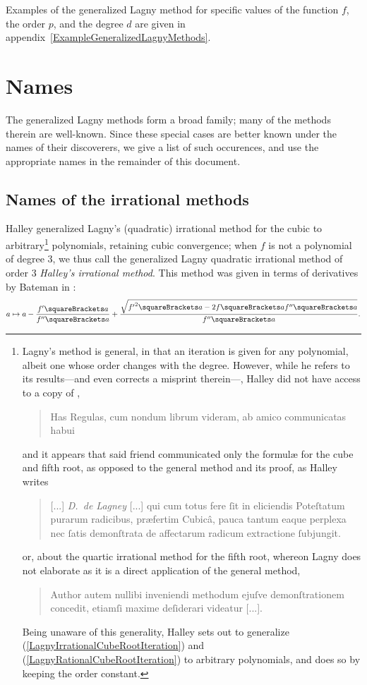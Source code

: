 ﻿\documentclass[10pt, a4paper, twoside]{basestyle}
\begin{document}
Examples of the generalized Lagny method for specific values of the function $f$, the order $p$, and the degree $d$
are given in appendix~\ref{ExampleGeneralizedLagnyMethods}.

\section*{Names}
The generalized Lagny methods form a broad family; many of the methods therein are well-known.
Since these special cases are better known under the names of their discoverers, we give a list of such
occurences, and use the appropriate names in the remainder of this document.
\subsection*{Names of the irrational methods}
Halley generalized Lagny's (quadratic) irrational method for the cubic to
arbitrary\footnote{Lagny's method is general, in that an iteration is given for any
polynomial, albeit one whose order changes with the degree. However, while he refers to its
results---and even corrects a misprint therein---, Halley
did not have access to a copy of \cite{FantetdeLagny1692},
\begin{quote}
Has Regulas, cum nondum librum videram, ab amico communicatas habui
\end{quote}
and it appears that said friend communicated only the formulæ for the cube and fifth root, as opposed to the
general method and its proof, as Halley writes
\begin{quote}
[...] \emph{D.~de Lagney} [...] qui cum totus fere ſit in eliciendis Poteſtatum purarum radicibus,
præfertim Cubicâ, pauca tantum eaque perplexa nec ſatis demonſtrata de affectarum radicum
extractione ſubjungit.
\end{quote}
or, about the quartic irrational method for the fifth root, whereon Lagny does not elaborate as
it is a direct application of the general method,
\begin{quote}
Author autem nullibi inveniendi methodum ejuſve demonſtrationem concedit,
etiamſi maxime deſiderari videatur [...].
\end{quote}
Being unaware of this generality, Halley sets out to generalize (\ref{LagnyIrrationalCubeRootIteration}) and (\ref{LagnyRationalCubeRootIteration}) to
arbitrary polynomials, and does so by keeping the order constant.}
polynomials, retaining cubic convergence; when $f$ is
not a polynomial of degree $3$, we thus call the generalized Lagny quadratic irrational method of
order $3$ \emph{Halley's irrational method}.
This method was given in terms of derivatives by Bateman in \cite[12]{Bateman1938}:\[
\FunctionBody{a}{a-\frac{f'\of{a}}}{f''\of{a}}+\frac{\sqrt{{f'}^2\of{a}-2f\of{a}f''\of{a}}}{f''\of{a}}\text.
\]
\end{document}
